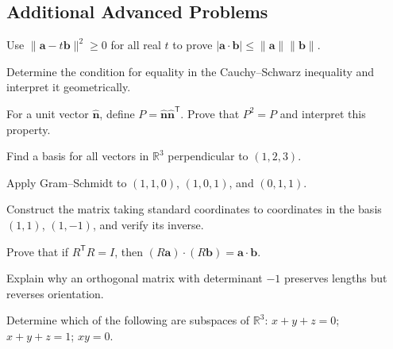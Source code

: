 \subsection*{Additional Advanced Problems}
\begin{chapterexercise}
Use $\lVert\mathbf a-t\mathbf b\rVert^2\ge0$ for all real $t$ to prove $|\mathbf a\cdot\mathbf b|\le\lVert\mathbf a\rVert\lVert\mathbf b\rVert$.
\end{chapterexercise}
\begin{chapterexercise}
Determine the condition for equality in the Cauchy--Schwarz inequality and interpret it geometrically.
\end{chapterexercise}
\begin{chapterexercise}
For a unit vector $\widehat{\mathbf n}$, define $P=\widehat{\mathbf n}\widehat{\mathbf n}^{\mathsf T}$. Prove that $P^2=P$ and interpret this property.
\end{chapterexercise}
\begin{chapterexercise}
Find a basis for all vectors in $\mathbb R^3$ perpendicular to $(1,2,3)$.
\end{chapterexercise}
\begin{chapterexercise}
Apply Gram--Schmidt to $(1,1,0)$, $(1,0,1)$, and $(0,1,1)$.
\end{chapterexercise}
\begin{chapterexercise}
Construct the matrix taking standard coordinates to coordinates in the basis $(1,1)$, $(1,-1)$, and verify its inverse.
\end{chapterexercise}
\begin{chapterexercise}
Prove that if $R^{\mathsf T}R=I$, then $(R\mathbf a)\cdot(R\mathbf b)=\mathbf a\cdot\mathbf b$.
\end{chapterexercise}
\begin{chapterexercise}
Explain why an orthogonal matrix with determinant $-1$ preserves lengths but reverses orientation.
\end{chapterexercise}
\begin{chapterexercise}
Determine which of the following are subspaces of $\mathbb R^3$: $x+y+z=0$; $x+y+z=1$; $xy=0$.
\end{chapterexercise}
